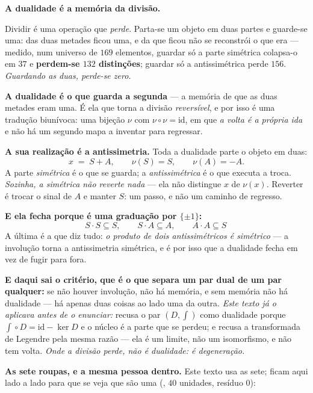 \documentclass[livro.tex]{subfiles}
\begin{document}
\begin{mdframed}[linewidth=0.4pt,innerleftmargin=10pt,innerrightmargin=10pt,
                 innertopmargin=8pt,innerbottommargin=8pt,skipabove=6pt,skipbelow=6pt]
\textbf{A dualidade é a memória da divisão.}

\medskip
Dividir é uma operação que \emph{perde}. Parta-se um objeto em duas partes e guarde-se uma: das
duas metades ficou uma, e da que ficou não se reconstrói o que era --- medido, num universo de
$169$ elementos, guardar só a parte simétrica colapsa-o em $37$ e \textbf{perdem-se $132$
distinções}; guardar só a antissimétrica perde $156$. \emph{Guardando as duas, perde-se zero.}

\medskip
\textbf{A dualidade é o que guarda a segunda} --- a memória de que as duas metades eram uma. É ela
que torna a divisão \emph{reversível}, e por isso é uma tradução biunívoca: uma bijeção $\nu$ com
$\nu\circ\nu=\mathrm{id}$, em que \emph{a volta é a própria ida} e não há um segundo mapa a
inventar para regressar.

\medskip
\textbf{A sua realização é a antissimetria.} Toda a dualidade parte o objeto em duas:
\[
  x \;=\; S + A, \qquad \nu(S)=S, \qquad \nu(A)=-A .
\]
A parte \emph{simétrica} é o que se guarda; a \emph{antissimétrica} é o que executa a troca.
\emph{Sozinha, a simétrica não reverte nada} --- ela não distingue $x$ de $\nu(x)$. Reverter é
trocar o sinal de $A$ e manter $S$: um passo, e não um caminho de regresso.

\medskip
\textbf{E ela fecha porque é uma graduação por $\{\pm1\}$:}
\[
  S\cdot S \subseteq S, \qquad S\cdot A \subseteq A, \qquad \boxed{A\cdot A \subseteq S\,}
\]
A última é a que diz tudo: \emph{o produto de dois antissimétricos é simétrico} --- a involução
torna a antissimetria simétrica, e é por isso que a dualidade fecha em vez de fugir para fora.

\medskip
\textbf{E daqui sai o critério, que é o que separa um par dual de um par qualquer:} se não houver
involução, não há memória, e sem memória não há dualidade --- há apenas duas coisas ao lado uma da
outra. \emph{Este texto já o aplicava antes de o enunciar:} recusa o par $(D,\int)$ como dualidade
porque $\int\!\circ D = \mathrm{id}-\ker D$ e o núcleo é a parte que se perdeu; e recusa a
transformada de Legendre pela mesma razão --- ela é um limite, não um isomorfismo, e não tem volta.
\emph{Onde a divisão perde, não é dualidade: é degeneração.}
\end{mdframed}

\noindent \textbf{As sete roupas, e a mesma pessoa dentro.} Este texto usa as sete; ficam aqui
lado a lado para que se veja que são uma (, $40$ unidades, resíduo $0$):
\end{document}

